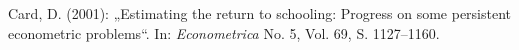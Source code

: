 

\begin{thebibliography}
 Card, D. (2001): „Estimating the return to schooling: Progress on some persistent econometric
	problems“. In: \textit{Econometrica} No. 5, Vol. 69, S. 1127–1160.
\end{thebibliography}